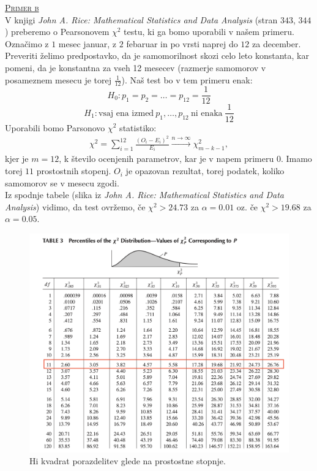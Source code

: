 \documentclass[a4paper,12pt]{article}
\begin{document}
\noindent
\textsc{\underline{Primer b}}
\\
V knjigi \textit{John A. Rice: Mathematical Statistics and Data Analysis} (stran $343$, $344$) preberemo o Pearsonovem $\chi^2$ testu, ki ga bomo uporabili v našem primeru.
\\
Označimo z $1$ mesec januar, z $2$ febaruar in po vrsti naprej do $12$ za december. 
\\
Preveriti želimo predpostavko, da je samomorilnost skozi celo leto konstanta, kar pomeni, da je konstantna za vseh 12 mesecev (razmerje samomorov v posameznem mesecu je torej $\frac{1}{12}$). Naš test bo v tem primeru enak:
$$ H_0 : p_1 = p_2 = \ldots = p_{12} = \frac{1}{12} $$
$$ H_1 : \text{vsaj ena izmed} \  p_1, \ldots, p_{12} \ \text{ni enaka} \ \frac{1}{12} $$
Uporabili bomo Parsonovo $\chi^2$ statistiko:
\begin{align}\label{en:hi}
    \chi^2 = \sum_{i = 1}^{12} \frac{(O_i - E_i)^2}{E_i} \xrightarrow{n \rightarrow \infty} \chi_{m - k - 1}^2, 
\end{align}
kjer je $m = 12$, k število ocenjenih parametrov, kar je v napem primeru $0$. Imamo torej $11$ prostostnih stopenj. $O_i$ je opazovan rezultat, torej podatek, koliko samomorov se v mesecu zgodi.
\\
Iz spodnje tabele (slika iz \textit{John A. Rice: Mathematical Statistics and Data Analysis}) vidimo, da test ovržemo, če $\chi^2 > 24.73$ za $\alpha = 0.01$ oz. če $\chi^2 > 19.68$ za $\alpha = 0.05$. 
\begin{figure}[ht!]
    \centering
    \includegraphics[width=130mm]{hi.png}
    \caption{Hi kvadrat porazdelitev glede na prostostne stopnje.}
\end{figure}
\end{document}
